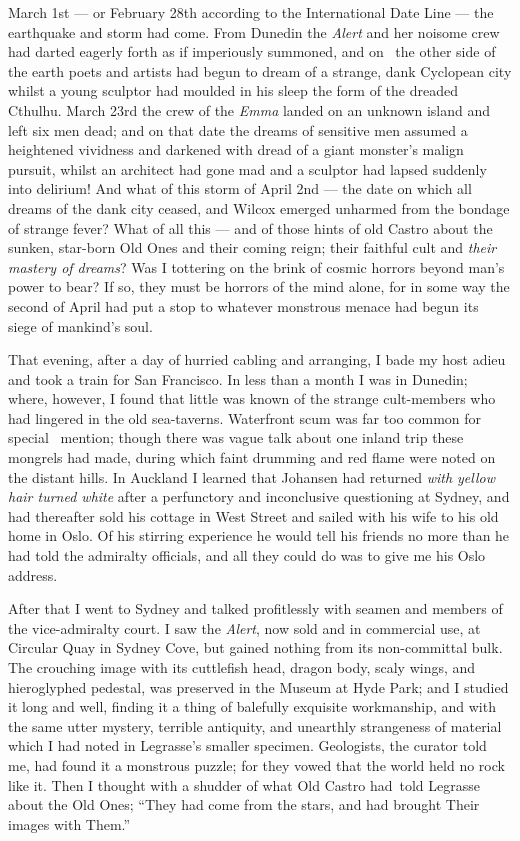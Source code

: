 March 1st --- or February 28th according to the International Date Line ---
the earthquake and storm had come. From Dunedin the \emph{Alert} and her
noisome crew had darted eagerly forth as if imperiously summoned, and on
\est\ the other side of the earth poets and artists had begun to dream of a
strange, dank Cyclopean city whilst a young sculptor had moulded in his
sleep the form of the dreaded Cthulhu. March 23rd the crew of the \emph{Emma}
landed on an unknown island and left six men dead; and on that date the
dreams of sensitive men assumed a heightened vividness and darkened with
dread of a giant monster's malign pursuit, whilst an architect had gone
mad and a sculptor had lapsed suddenly into delirium! And what of this
storm of April 2nd --- the date on which all dreams of the dank city
ceased, and Wilcox emerged unharmed from the bondage of strange fever?
What of all this --- and of those hints of old Castro about the sunken,
star-born Old Ones and their coming reign; their faithful cult and \emph{their
mastery of dreams}? Was I tottering on the brink of cosmic horrors beyond
man's power to bear? If so, they must be horrors of the mind alone, for
in some way the second of April had put a stop to whatever monstrous
menace had begun its siege of mankind's soul.

That evening, after a day of hurried cabling and arranging, I bade my
host adieu and took a train for San Francisco. In less than a month I
was in Dunedin; where, however, I found that little was known of the
strange cult-members who had lingered in the old sea-taverns. Waterfront
scum was far too common for special \est\ mention; though there was vague talk
about one inland trip these mongrels had made, during which faint
drumming and red flame were noted on the distant hills. In Auckland I
learned that Johansen had returned \emph{with yellow hair turned white} after a
perfunctory and inconclusive questioning at Sydney, and had thereafter
sold his cottage in West Street and sailed with his wife to his old home
in Oslo. Of his stirring experience he would tell his friends no more
than he had told the admiralty officials, and all they could do was to
give me his Oslo address.

After that I went to Sydney and talked profitlessly with seamen and
members of the vice-admiralty court. I saw the \emph{Alert}, now sold and in
commercial use, at Circular Quay in Sydney Cove, but gained nothing from
its non-committal bulk. The crouching image with its cuttlefish head,
dragon body, scaly wings, and hieroglyphed pedestal, was preserved in
the Museum at Hyde Park; and I studied it long and well, finding it a
thing of balefully exquisite workmanship, and with the same utter
mystery, terrible antiquity, and unearthly strangeness of material which
I had noted in Legrasse's smaller specimen. Geologists, the curator told
me, had found it a monstrous puzzle; for they vowed that the world held
no rock like it. Then I thought with a shudder of what Old Castro had\est\
 told Legrasse about the Old Ones; ``They had come from the stars, and
had brought Their images with Them.''

